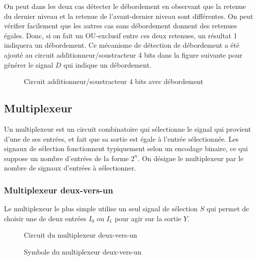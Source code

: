 \documentclass[11pt]{article}
\begin{document}
On peut dans les deux cas détecter le débordement en observant que la
retenue du dernier niveau et la retenue de l'avant-dernier niveau sont
différentes. On peut vérifier facilement que les autres cas sans
débordement donnent des retenues égales. Donc, si on fait un
OU-exclusif entre ces deux retenues, un résultat 1 indiquera un
débordement. Ce mécanisme de détection de débordement a été ajouté au
circuit additionneur/soustracteur 4 bits dans la figure suivante pour
générer le signal \(D\) qui indique un débordement.

\begin{figure}[htbp]
\centering

\caption{\label{fig:org98a0f4a}Circuit additionneur/soustracteur 4 bits avec débordement}
\end{figure}


\subsection{Multiplexeur}
\label{sec:orgb85a80b}

Un multiplexeur est un circuit combinatoire qui sélectionne le signal
qui provient d'une de ses entrées, et fait que sa sortie est égale à
l'entrée sélectionnée. Les signaux de sélection fonctionnent
typiquement selon un encodage binaire, ce qui suppose un nombre
d'entrées de la forme \(2^n\). On désigne le multiplexeur par le
nombre de signaux d'entrées à sélectionner.

\subsubsection{Multiplexeur deux-vers-un}
\label{sec:org572e930}

Le multiplexeur le plus simple utilise un seul signal de sélection
\(S\) qui permet de choisir une de deux entrées \(I_0\) ou \(I_1\)
pour agir sur la sortie \(Y\).

\begin{figure}[htbp]
\centering

\caption{\label{fig:org8a1c019}Circuit du multiplexeur deux-vers-un}
\end{figure}

\begin{figure}[htbp]
\centering

\caption{\label{fig:orgb1abf54}Symbole du multiplexeur deux-vers-un}
\end{figure}
\end{document}
